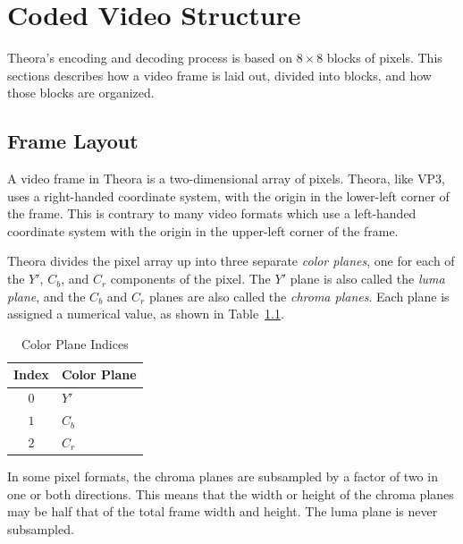 \documentclass[9pt,letterpaper]{book}
\newcommand{\term}[1]{{\em #1}}
\numberwithin{equation}{chapter}
\numberwithin{figure}{chapter}
\numberwithin{table}{chapter}
\begin{document}
\chapter{Coded Video Structure}

Theora's encoding and decoding process is based on $8\times 8$ blocks of
 pixels.
This sections describes how a video frame is laid out, divided into
 blocks, and how those blocks are organized.

\section{Frame Layout}

A video frame in Theora is a two-dimensional array of pixels.
Theora, like VP3, uses a right-handed coordinate system, with the origin in the
 lower-left corner of the frame.
This is contrary to many video formats which use a left-handed coordinate
 system with the origin in the upper-left corner of the frame.

Theora divides the pixel array up into three separate \term{color planes}, one
 for each of the $Y'$, $C_b$, and $C_r$ components of the pixel.
The $Y'$ plane is also called the \term{luma plane}, and the $C_b$ and $C_r$
 planes are also called the \term{chroma planes}.
Each plane is assigned a numerical value, as shown in
 Table~\ref{tab:color-planes}.

\begin{table}[htbp]
\begin{center}
\begin{tabular}{cl}\toprule
Index & Color Plane \\\midrule
$0$   & $Y'$        \\
$1$   & $C_b$       \\
$2$   & $C_r$       \\
\bottomrule\end{tabular}
\end{center}
\caption{Color Plane Indices}
\label{tab:color-planes}
\end{table}

In some pixel formats, the chroma planes are subsampled by a factor of two
 in one or both directions.
This means that the width or height of the chroma planes may be half that of
 the total frame width and height.
The luma plane is never subsampled.
\end{document}
